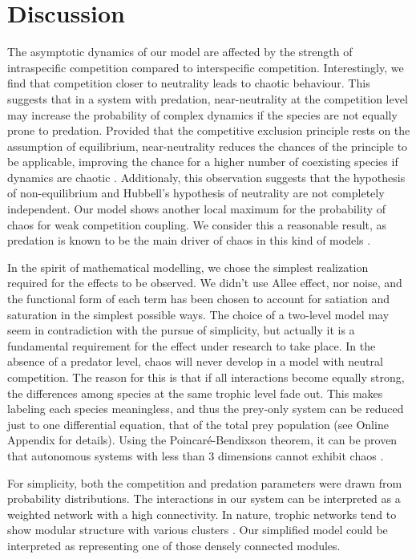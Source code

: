 \section{Discussion}
\label{sec:Discussion}
The asymptotic dynamics of our model are affected by the strength of intraspecific competition compared to interspecific competition. Interestingly, we find that competition closer to neutrality leads to chaotic behaviour. This suggests that in a system with predation, near-neutrality at the competition level may increase the probability of complex dynamics if the species are not equally prone to predation. Provided that the competitive exclusion principle rests on the assumption of equilibrium, near-neutrality reduces the chances of the principle to be applicable, improving the chance for a higher number of coexisting species if dynamics are chaotic \cite{Huisman1999}. Additionaly, this observation suggests that the hypothesis of non-equilibrium and Hubbell's hypothesis of neutrality are not completely independent. Our model shows another local maximum for the probability of chaos for weak competition coupling. We consider this a reasonable result, as predation is known to be the main driver of chaos in this kind of models \cite{Scheffer2004}.

In the spirit of mathematical modelling, we chose the simplest realization required for the effects to be observed. We didn't use Allee effect, nor noise, and the functional form of each term has been chosen to account for satiation and saturation in the simplest possible ways. The choice of a two-level model may seem in contradiction with the pursue of simplicity, but actually it is a fundamental requirement for the effect under research to take place. In the absence of a predator level, chaos will never develop in a model with neutral competition. The reason for this is that if all interactions become equally strong, the differences among species at the same trophic level fade out. This makes labeling each species meaningless, and thus the prey-only system can be reduced just to one differential equation, that of the total prey population (see Online Appendix for details). Using the Poincaré-Bendixson theorem, it can be proven that autonomous systems with less than $3$ dimensions cannot exhibit chaos \cite{Strogatz1994}.

For simplicity, both the competition and predation parameters were drawn from probability distributions. The interactions in our system can be interpreted as a weighted network with a high connectivity. In nature, trophic networks tend to show modular structure with various clusters \cite{Thebault2010}. Our simplified model could be interpreted as representing one of those densely connected modules.

